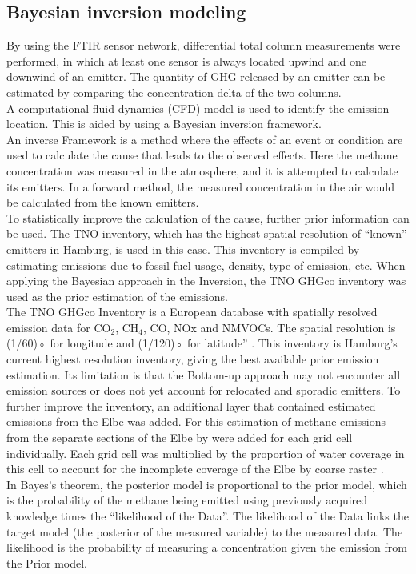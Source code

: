 \subsection{Bayesian inversion modeling}
By using the FTIR sensor network,  differential total column measurements were performed, in which at least one sensor is always located upwind and one downwind of an emitter. The quantity of GHG released by an emitter can be estimated by comparing the concentration delta of the two columns.\\
A computational fluid dynamics (CFD) model is used to identify the emission location. This is aided by using a Bayesian inversion framework.\\
An inverse Framework is a method where the effects of an event or condition are used to calculate the cause that leads to the observed effects. Here the methane concentration was measured in the atmosphere, and it is attempted to calculate its emitters. In a forward method, the measured concentration in the air would be calculated from the known emitters.\\
To statistically improve the calculation of the cause, further prior information can be used. The TNO inventory, which has the highest spatial resolution of “known” emitters in Hamburg, is used in this case. This inventory is compiled by estimating emissions due to fossil fuel usage, density, type of emission, etc.
When applying the Bayesian approach in the Inversion, the TNO GHGco inventory was used as the prior estimation of the emissions.\\
The TNO GHGco Inventory is a European database with spatially resolved emission data for CO$_2$, CH$_4$, CO, NOx and NMVOCs. The spatial resolution is (1/60)◦ for longitude and (1/120)◦ for latitude” \cite{Super.2020} \cite{Super.2019}. This inventory is Hamburg's current highest resolution inventory, giving the best available prior emission estimation. Its limitation is that the Bottom-up approach may not encounter all emission sources or does not yet account for relocated and sporadic emitters. To further improve the inventory, an additional layer that contained estimated emissions from the Elbe was added. For this estimation of methane emissions from the separate sections of the Elbe by \cite{Matousu.2017} were added for each grid cell individually. Each grid cell was multiplied by the proportion of water coverage in this cell to account for the incomplete coverage of the Elbe by coarse raster \cite{Forstmaier.2023}.\\
In Bayes’s theorem, the posterior model is proportional to the prior model, which is the probability of the methane being emitted using previously acquired knowledge times the “likelihood of the Data”. The likelihood of the Data links the target model (the posterior of the measured variable) to the measured data. The likelihood is the probability of measuring a concentration given the emission from the Prior model.
